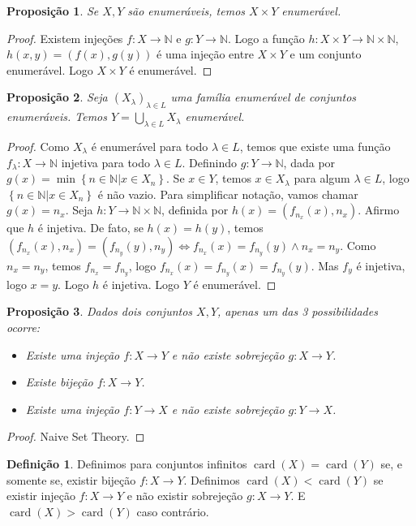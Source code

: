 \documentclass{article}
\theoremstyle{plain}
\newtheorem{prop}{Proposição}[section]
\theoremstyle{definition}
\newtheorem{definicao}{Definição}[section]
\theoremstyle{remark}
\DeclareMathOperator{\card}{card}
\begin{document}
\begin{prop}
	Se $X,Y$ são enumeráveis, temos $X\times Y$ enumerável.
\end{prop}
\begin{proof}
	Existem injeções $f: X \to \mathbb{N}$ e $g: Y \to \mathbb{N}$. Logo a função $h : X \times Y \to \mathbb{N} \times \mathbb{N}$, $h(x,y) = (f(x), g(y))$ é uma injeção entre $X \times Y$ e um conjunto enumerável.  Logo $X\times Y$ é enumerável.
\end{proof}
\begin{prop}
	Seja $(X_{\lambda})_{\lambda \in L}$ uma família enumerável de conjuntos enumeráveis. Temos $Y = \displaystyle\bigcup_{\lambda \in L} X_{\lambda}$ enumerável.
\end{prop}
\begin{proof}
	Como $X_{\lambda}$ é enumerável para todo $\lambda\in L$, temos que existe uma função $f_\lambda : X \to \mathbb{N}$ injetiva para todo $\lambda\in L$. Definindo $g: Y \to \mathbb{N}$, dada por $g(x) = \min \left\{ n\in \mathbb{N} | x \in X_n \right\}$. Se $x\in Y$, temos $x\in X_\lambda$ para algum $\lambda \in L$, logo $\left\{n \in \mathbb{N} |  x\in X_{n}\right\}$ é não vazio. Para simplificar notação, vamos chamar $g(x) = n_x$.  Seja $h: Y \to \mathbb{N} \times \mathbb{N}$, definida por $h(x) = \left( f_{n_x}(x), n_x\right)$.  Afirmo que $h$ é injetiva. De fato, se $h(x) = h(y)$, temos $(f_{n_x}(x), n_x) = (f_{n_y}(y), n_y) \iff f_{n_x}(x) = f_{n_y}(y) \land n_x = n_y$. Como $n_x = n_y$, temos  $f_{n_x} = f_{n_y}$, logo $f_{n_x}(x) = f_{n_y}(x) = f_{n_y}(y)$. Mas $f_y$ é injetiva, logo $x = y$. Logo $h$ é injetiva. Logo $Y$ é enumerável.
\end{proof}
\begin{prop}
	Dados dois conjuntos $X,Y$, apenas um das 3 possibilidades ocorre: 
	\begin{itemize}
		\item Existe uma injeção $f: X \to Y$ e não existe sobrejeção $g: X \to Y$.
		\item Existe bijeção $f: X\to Y$. 
		\item Existe uma injeção $f: Y \to X$ e não existe sobrejeção $g: Y \to X$.
	\end{itemize}
\end{prop}
\begin{proof}
	Naive Set Theory. %
\end{proof}
\begin{definicao}
	Definimos para conjuntos infinitos $\card(X) = \card(Y)$ se, e somente se, existir bijeção $f: X\to Y$. Definimos $\card(X) < \card(Y)$ se existir injeção $f: X \to Y$ e não existir sobrejeção $g:X \to Y$. E $\card(X) > \card(Y)$ caso contrário.
\end{definicao}
\end{document}
